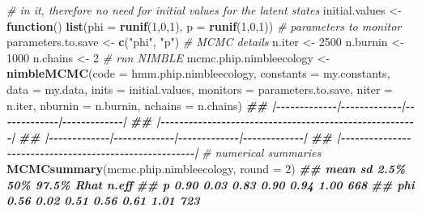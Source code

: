 \documentclass[
  12pt,
]{krantz}
\newenvironment{Shaded}{\begin{snugshade}}{\end{snugshade}}
\newcommand{\AttributeTok}[1]{\textcolor[rgb]{0.13,0.29,0.53}{#1}}
\newcommand{\CommentTok}[1]{\textcolor[rgb]{0.56,0.35,0.01}{\textit{#1}}}
\newcommand{\ControlFlowTok}[1]{\textcolor[rgb]{0.13,0.29,0.53}{\textbf{#1}}}
\newcommand{\DecValTok}[1]{\textcolor[rgb]{0.00,0.00,0.81}{#1}}
\newcommand{\DocumentationTok}[1]{\textcolor[rgb]{0.56,0.35,0.01}{\textbf{\textit{#1}}}}
\newcommand{\FunctionTok}[1]{\textcolor[rgb]{0.13,0.29,0.53}{\textbf{#1}}}
\newcommand{\NormalTok}[1]{#1}
\newcommand{\OtherTok}[1]{\textcolor[rgb]{0.56,0.35,0.01}{#1}}
\newcommand{\StringTok}[1]{\textcolor[rgb]{0.31,0.60,0.02}{#1}}
\begin{document}
\begin{Shaded}
\begin{Highlighting}[]
\CommentTok{\# in it, therefore no need for initial values for the latent states}
\NormalTok{initial.values }\OtherTok{\textless{}{-}} \ControlFlowTok{function}\NormalTok{() }\FunctionTok{list}\NormalTok{(}\AttributeTok{phi =} \FunctionTok{runif}\NormalTok{(}\DecValTok{1}\NormalTok{,}\DecValTok{0}\NormalTok{,}\DecValTok{1}\NormalTok{),}
                                  \AttributeTok{p =} \FunctionTok{runif}\NormalTok{(}\DecValTok{1}\NormalTok{,}\DecValTok{0}\NormalTok{,}\DecValTok{1}\NormalTok{))}
\CommentTok{\# parameters to monitor}
\NormalTok{parameters.to.save }\OtherTok{\textless{}{-}} \FunctionTok{c}\NormalTok{(}\StringTok{"phi"}\NormalTok{, }\StringTok{"p"}\NormalTok{)}
\CommentTok{\# MCMC details}
\NormalTok{n.iter }\OtherTok{\textless{}{-}} \DecValTok{2500}
\NormalTok{n.burnin }\OtherTok{\textless{}{-}} \DecValTok{1000}
\NormalTok{n.chains }\OtherTok{\textless{}{-}} \DecValTok{2}
\CommentTok{\# run NIMBLE}
\NormalTok{mcmc.phip.nimbleecology }\OtherTok{\textless{}{-}} \FunctionTok{nimbleMCMC}\NormalTok{(}\AttributeTok{code =}\NormalTok{ hmm.phip.nimbleecology, }
                        \AttributeTok{constants =}\NormalTok{ my.constants,}
                        \AttributeTok{data =}\NormalTok{ my.data,              }
                        \AttributeTok{inits =}\NormalTok{ initial.values,}
                        \AttributeTok{monitors =}\NormalTok{ parameters.to.save,}
                        \AttributeTok{niter =}\NormalTok{ n.iter,}
                        \AttributeTok{nburnin =}\NormalTok{ n.burnin, }
                        \AttributeTok{nchains =}\NormalTok{ n.chains)}
\DocumentationTok{\#\# |{-}{-}{-}{-}{-}{-}{-}{-}{-}{-}{-}{-}{-}|{-}{-}{-}{-}{-}{-}{-}{-}{-}{-}{-}{-}{-}|{-}{-}{-}{-}{-}{-}{-}{-}{-}{-}{-}{-}{-}|{-}{-}{-}{-}{-}{-}{-}{-}{-}{-}{-}{-}{-}|}
\DocumentationTok{\#\# |{-}{-}{-}{-}{-}{-}{-}{-}{-}{-}{-}{-}{-}{-}{-}{-}{-}{-}{-}{-}{-}{-}{-}{-}{-}{-}{-}{-}{-}{-}{-}{-}{-}{-}{-}{-}{-}{-}{-}{-}{-}{-}{-}{-}{-}{-}{-}{-}{-}{-}{-}{-}{-}{-}{-}|}
\DocumentationTok{\#\# |{-}{-}{-}{-}{-}{-}{-}{-}{-}{-}{-}{-}{-}|{-}{-}{-}{-}{-}{-}{-}{-}{-}{-}{-}{-}{-}|{-}{-}{-}{-}{-}{-}{-}{-}{-}{-}{-}{-}{-}|{-}{-}{-}{-}{-}{-}{-}{-}{-}{-}{-}{-}{-}|}
\DocumentationTok{\#\# |{-}{-}{-}{-}{-}{-}{-}{-}{-}{-}{-}{-}{-}{-}{-}{-}{-}{-}{-}{-}{-}{-}{-}{-}{-}{-}{-}{-}{-}{-}{-}{-}{-}{-}{-}{-}{-}{-}{-}{-}{-}{-}{-}{-}{-}{-}{-}{-}{-}{-}{-}{-}{-}{-}{-}|}
\CommentTok{\# numerical summaries}
\FunctionTok{MCMCsummary}\NormalTok{(mcmc.phip.nimbleecology, }\AttributeTok{round =} \DecValTok{2}\NormalTok{)}
\DocumentationTok{\#\#     mean   sd 2.5\%  50\% 97.5\% Rhat n.eff}
\DocumentationTok{\#\# p   0.90 0.03 0.83 0.90  0.94 1.00   668}
\DocumentationTok{\#\# phi 0.56 0.02 0.51 0.56  0.61 1.01   723}
\end{Highlighting}
\end{Shaded}
\end{document}

